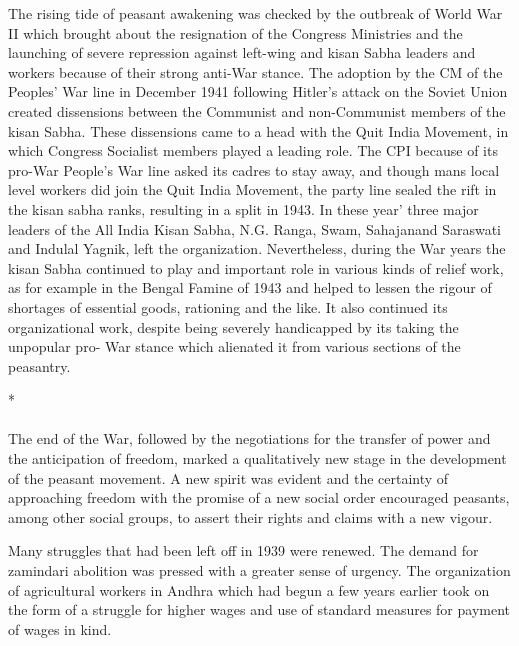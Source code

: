 \begin{multicols}{2}
The rising tide of peasant awakening was checked by the outbreak of World War II which brought about the resignation of the Congress Ministries and the launching of severe repression against left-wing and kisan Sabha leaders and workers because of their strong anti-War stance. The adoption by the CM of the Peoples' War line in December 1941 following Hitler's attack on the Soviet Union created dissensions between the Communist and non-Communist members of the kisan Sabha. These dissensions came to a head with the Quit India Movement, in which Congress Socialist members played a leading role. The CPI because of its pro-War People's War line asked its cadres to stay away, and though mans local level workers did join the Quit India Movement, the party line sealed the rift in the kisan sabha ranks, resulting in a split in 1943. In these year' three major leaders of the All India Kisan Sabha, N.G. Ranga, Swam, Sahajanand Saraswati and Indulal Yagnik, left the organization. Nevertheless, during the War years the kisan Sabha continued to play and important role in various kinds of relief work, as for example in the Bengal Famine of 1943 and helped to lessen the rigour of shortages of essential goods, rationing and the like. It also continued its organizational work, despite being severely handicapped by its taking the unpopular pro- War stance which alienated it from various sections of the peasantry.

\begin{center}*\end{center}

\paragraph*{}

The end of the War, followed by the negotiations for the transfer of power and the anticipation of freedom, marked a qualitatively new stage in the development of the peasant movement. A new spirit was evident and the certainty of approaching freedom with the promise of a new social order encouraged peasants, among other social groups, to assert their rights and claims with a new vigour.

Many struggles that had been left off in 1939 were renewed. The demand for zamindari abolition was pressed with a greater sense of urgency. The organization of agricultural workers in Andhra which had begun a few years earlier took on the form of a struggle for higher wages and use of standard measures for payment of wages in kind.


\end{multicols}

